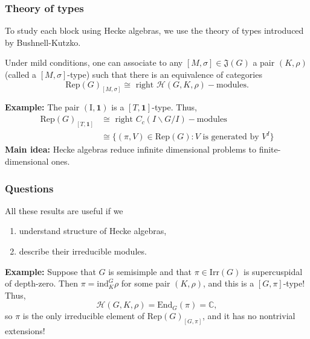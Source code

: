\documentclass{beamer}
\newcommand{\Rep}{\mathrm{Rep}}
\newcommand{\Irr}{\mathrm{Irr}}
\newcommand{\End}{\mathrm{End}}
\newcommand{\ind}{\mathrm{ind}}
\newcommand{\CC}{\mathbb{C}}
\newcommand{\cH}{\mathcal{H}}
\theoremstyle{plain}
\begin{document}
\begin{frame}
    \frametitle{Theory of types}
    To study each block using Hecke algebras, we use the theory of types introduced by Bushnell-Kutzko.

    \begin{theorem}
        Under mild conditions, one can associate to any $[M,\sigma]\in\mathfrak{J}(G)$ a pair $(K,\rho)$ (called a $[M,\sigma]$-type) such that there is an equivalence of categories
        \[ \Rep(G)_{[M,\sigma]}\cong\text{ right }\cH(G,K,\rho)-\text{modules}.\]
    \end{theorem}

    \textbf{Example:} The pair $(\text{I},\mathbf{1})$ is a $[T,\mathbf{1}]$-type. Thus, 
    \begin{align*}
        \Rep(G)_{[T,\mathbf{1}]}&\cong\text{ right }C_c(I\backslash G/I)-\text{modules}\\ 
        &\cong\{(\pi,V)\in\Rep(G):V\text{ is generated by }V^I\}
    \end{align*}
    \textbf{Main idea:} Hecke algebras reduce infinite dimensional problems to finite-dimensional ones.
   
\end{frame}

\iffalse
\begin{frame}
    \frametitle{Examples}
    \textbf{Example:} $\cH(G,K,\mathbf{1})\cong C_c(K\backslash G/K)$ with the convolution product. There is a bijection
    \[\{(\pi,V)\in\Irr(G):V^K\neq 0\}\longleftrightarrow \text{ irreducible }C_c(K\backslash G/K) \text{-mod.}\]
    \vspace{0.5cm}
\end{frame}
\fi

\begin{frame}
    \frametitle{Questions}
    All these results are useful if we
    \begin{enumerate}
        \item understand structure of Hecke algebras,
        \item describe their irreducible modules.
    \end{enumerate}
    \vspace{0.5cm}
    \textbf{Example:} Suppose that $G$ is semisimple and that $\pi\in\Irr(G)$ is supercuspidal of depth-zero. Then $\pi=\ind_K^G\rho$ for some pair $(K,\rho)$, and this is a $[G,\pi]$-type! Thus,
    \[\cH(G,K,\rho)=\End_G(\pi)=\CC,\]
    so $\pi$ is the only irreducible element of $\Rep(G)_{[G,\pi]}$, and it has no nontrivial extensions!
\end{frame}
\end{document}
